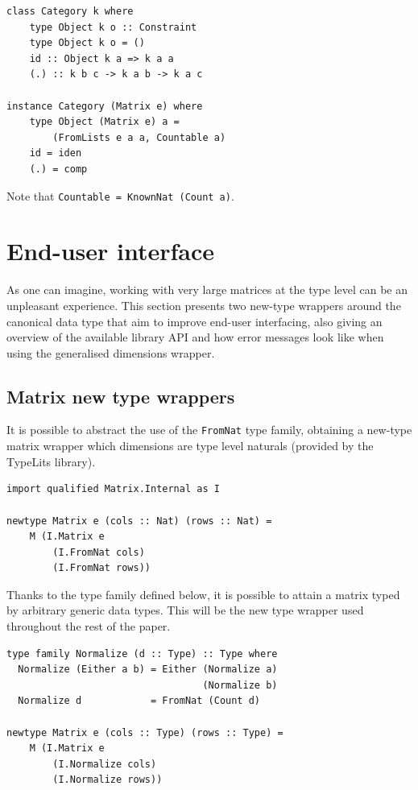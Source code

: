 \documentclass[sigplan,screen]{acmart}\settopmatter{}
\newcommand{\hs}{\texttt}
\def\doc{paper}
\begin{document}
\vspace{1mm}
\begin{verbatim}
class Category k where
    type Object k o :: Constraint
    type Object k o = ()
    id :: Object k a => k a a
    (.) :: k b c -> k a b -> k a c
    
instance Category (Matrix e) where
    type Object (Matrix e) a =
        (FromLists e a a, Countable a)
    id = iden
    (.) = comp
\end{verbatim}
\vspace{1mm}
Note that \hs{Countable = KnownNat (Count a)}.

\section{End-user interface}\label{sec-manipulation}

As one can imagine, working with very large matrices at the type level can be an unpleasant experience. This section presents two new-type wrappers around the canonical data type that aim to improve end-user interfacing, also giving an overview of the available library API and how error messages look like when using the generalised dimensions wrapper.

\subsection{Matrix new type wrappers}\label{subsec-newtype-wrappers}

It is possible to abstract the use of the \hs{FromNat} type family, obtaining a new-type matrix wrapper which dimensions are type level naturals (provided by the TypeLits library). 

\vspace{1mm}
\begin{verbatim}
import qualified Matrix.Internal as I

newtype Matrix e (cols :: Nat) (rows :: Nat) = 
    M (I.Matrix e 
        (I.FromNat cols)
        (I.FromNat rows))
\end{verbatim}
\vspace{1mm}

Thanks to the type family defined below, it is possible to attain a matrix typed by arbitrary generic data types. This will be the new type wrapper used throughout the rest of the \doc.

\vspace{1mm}
\begin{verbatim}
type family Normalize (d :: Type) :: Type where
  Normalize (Either a b) = Either (Normalize a)
                                  (Normalize b)
  Normalize d            = FromNat (Count d)

newtype Matrix e (cols :: Type) (rows :: Type) = 
    M (I.Matrix e 
        (I.Normalize cols) 
        (I.Normalize rows)) 
\end{verbatim}
\vspace{1mm}
\end{document}
